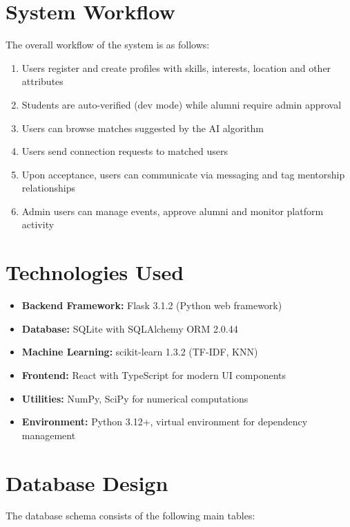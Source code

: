 \documentclass[12pt,a4paper]{report}
\let\origsection\section
\renewcommand{\section}{\needspace{4\baselineskip}\origsection}
\begin{document}
\section{System Workflow}

The overall workflow of the system is as follows:

\begin{enumerate}[noitemsep]
    \item Users register and create profiles with skills, interests, location and other attributes
    \item Students are auto-verified (dev mode) while alumni require admin approval
    \item Users can browse matches suggested by the AI algorithm
    \item Users send connection requests to matched users
    \item Upon acceptance, users can communicate via messaging and tag mentorship relationships
    \item Admin users can manage events, approve alumni and monitor platform activity
\end{enumerate}

\section{Technologies Used}

\begin{itemize}[noitemsep]
    \item \textbf{Backend Framework:} Flask 3.1.2 (Python web framework)
    \item \textbf{Database:} SQLite with SQLAlchemy ORM 2.0.44
    \item \textbf{Machine Learning:} scikit-learn 1.3.2 (TF-IDF, KNN)
    \item \textbf{Frontend:} React with TypeScript for modern UI components
    \item \textbf{Utilities:} NumPy, SciPy for numerical computations
    \item \textbf{Environment:} Python 3.12+, virtual environment for dependency management
\end{itemize}

\section{Database Design}

The database schema consists of the following main tables:
\end{document}

